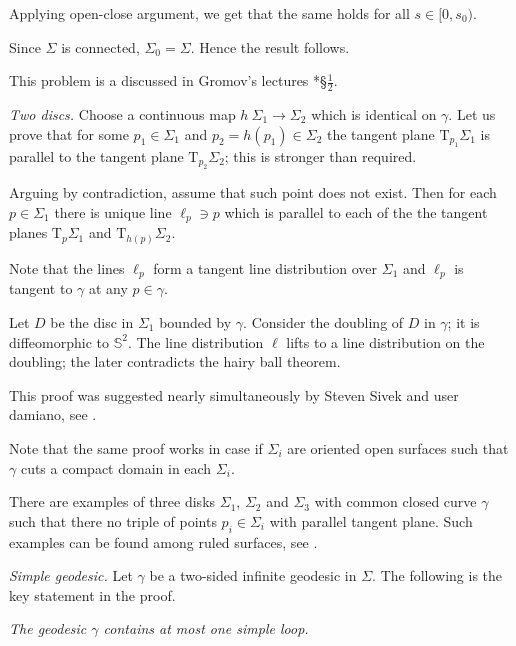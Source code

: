 Applying open-close argument, we get that the same holds for all $s\in[0,s_0)$.

Since $\Sigma$ is connected, $\Sigma_0=\Sigma$.
Hence the result follows.

This problem is a discussed in Gromov's lectures \cite{gromov-SGMC}*{\S$\tfrac12$}.



\textit{Two discs.}
Choose a continuous map $h\:\Sigma_1\to \Sigma_2$
which is identical on $\gamma$.
Let us prove that for some $p_1\in \Sigma_1$ and $p_2=h(p_1)\in \Sigma_2$
the tangent plane $\mathrm{T}_{p_1} \Sigma_1$ is parallel to the tangent plane $\mathrm{T}_{p_2} \Sigma_2$;
this is stronger than required.

Arguing by contradiction,
assume that such point does not exist.
Then for each $p\in\Sigma_1$
there is unique line $\ell_p\ni p$ 
which is parallel to each of the the tangent planes $\mathrm{T}_{p} \Sigma_1$ and $\mathrm{T}_{h(p)} \Sigma_2$.

Note that the lines $\ell_p$ form a tangent line distribution over $\Sigma_1$
and $\ell_p$ is tangent to $\gamma$ at any $p\in\gamma$.

Let $D$ be the disc in $\Sigma_1$ bounded by $\gamma$.
Consider the doubling of $D$ in $\gamma$;
it is diffeomorphic to $\mathbb S^2$.
The line distribution $\ell$ lifts to a line distribution on the doubling;
the later contradicts the hairy ball theorem.

 This proof was suggested nearly simultaneously by Steven Sivek and user damiano, see \cite{two-discs}.

Note that the same proof works in case if $\Sigma_i$ are oriented open surfaces such that $\gamma$ cuts a compact domain in each $\Sigma_i$.

There are examples of three disks $\Sigma_1$, $\Sigma_2$ and $\Sigma_3$
with common closed curve $\gamma$ such that there no triple of points $p_i\in\Sigma_i$ with parallel tangent plane.
Such examples can be found among ruled surfaces, see \cite{three-discs}.



\textit{Simple geodesic.}
Let $\gamma$ be a two-sided infinite geodesic in $\Sigma$.
The following is the key statement in the proof.

{\it The geodesic $\gamma$ contains at most one simple loop.}
\medskip

